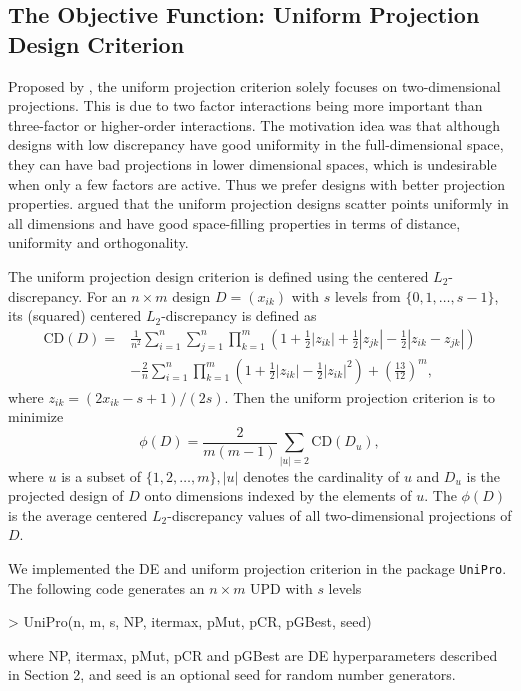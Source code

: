 \documentclass [PhD] {package/uclathes}
\begin{document}
\subsection*{The Objective Function: Uniform Projection Design Criterion}
Proposed by \textcite{sun2019uniform}, the uniform projection criterion solely focuses on  two-dimensional projections. This is due to two factor interactions being more important than three-factor or higher-order interactions. The motivation idea was that although designs with low discrepancy have good uniformity in the full-dimensional space, they can have bad projections in lower dimensional spaces, which is undesirable when only a few factors are active. Thus we prefer designs with better projection properties. \textcite{sun2019uniform} argued that the uniform projection designs scatter points uniformly in all dimensions and have good space-filling properties in terms of distance, uniformity and orthogonality.

The uniform projection design criterion is defined using the centered $L_2$-discrepancy.
For an $n \times m$ design $D=\left(x_{i k}\right)$ with $s$ levels from $\{0, 1, \ldots, s-1 \}$, its (squared) centered $L_2$-discrepancy is defined as
$$
\begin{aligned}
  \mathrm{CD}(D)= & \frac{1}{n^2} \sum_{i=1}^n \sum_{j=1}^n
  \prod_{k=1}^m\left(1+\frac{1}{2}\left|z_{i k}\right| +
  \frac{1}{2}\left|z_{j k}\right| -
  \frac{1}{2}\left|z_{i k}-z_{j k}\right|\right) \\
  & -\frac{2}{n} \sum_{i=1}^n \prod_{k=1}^m\left(1+\frac{1}{2}
  \left|z_{i k}\right|-\frac{1}{2}\left|z_{i k}\right|^2\right)+
  \left(\frac{13}{12}\right)^m,
  \end{aligned}
$$
where $z_{i k}=\left(2 x_{i k}-s+1\right) /(2 s)$. Then the uniform projection criterion is to minimize
\begin{equation}
  \phi(D)=\frac{2}{m(m-1)} \sum_{|u|=2} \mathrm{CD}\left(D_u\right),
  \label{upd}
\end{equation}
where $u$ is a subset of $\{1,2, \ldots, m\},|u|$ denotes the cardinality of $u$ and $D_u$ is the projected design of $D$ onto dimensions indexed by the elements of $u$. The $\phi(D)$ is the average centered $L_2$-discrepancy values of all two-dimensional projections of $D$.

We implemented the DE and uniform projection criterion in the package \texttt{UniPro}. %
The following code generates an $n\times m$ UPD with $s$ levels
\begin{Schunk}
\begin{Sinput}
> UniPro(n, m, s, NP, itermax, pMut, pCR, pGBest, seed)
\end{Sinput}
\end{Schunk}
where {NP}, {itermax}, pMut, pCR and pGBest are DE hyperparameters described in Section 2, and {seed} is an optional seed for random number generators.
\end{document}
